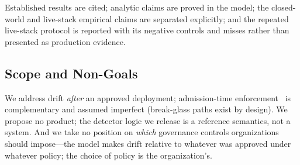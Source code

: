 Established results are cited; analytic claims are proved in the model; the
closed-world and live-stack empirical claims are separated explicitly; and
the repeated live-stack protocol is reported with its negative controls and
misses rather than presented as production evidence.

\subsection{Scope and Non-Goals}
We address drift \emph{after} an approved deployment; admission-time
enforcement~\cite{k8sadmission,opa,kyverno,binauthz} is complementary and
assumed imperfect (break-glass paths exist by design). We propose no product;
the detector logic we release is a reference semantics, not a system. And we
take no position on \emph{which} governance controls organizations should
impose---the model makes drift relative to whatever was approved under
whatever policy; the choice of policy is the organization's.

